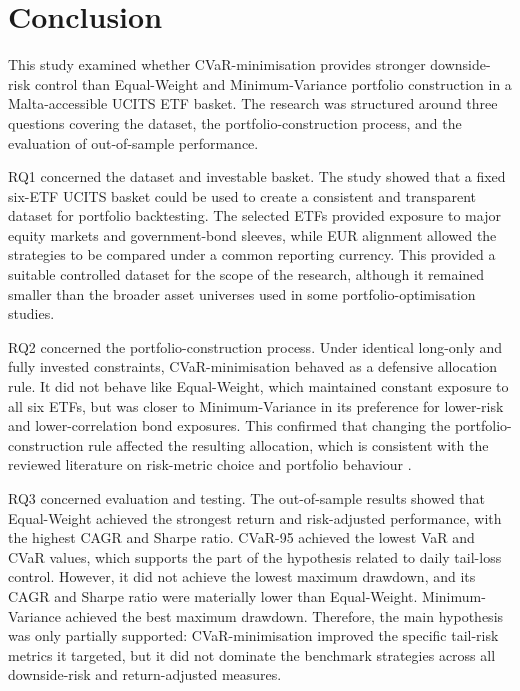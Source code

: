 \section{Conclusion}
\label{sec:Con}

\par This study examined whether CVaR-minimisation provides stronger downside-risk control than Equal-Weight and Minimum-Variance portfolio construction in a Malta-accessible UCITS ETF basket. The research was structured around three questions covering the dataset, the portfolio-construction process, and the evaluation of out-of-sample performance.

\par RQ1 concerned the dataset and investable basket. The study showed that a fixed six-ETF UCITS basket could be used to create a consistent and transparent dataset for portfolio backtesting. The selected ETFs provided exposure to major equity markets and government-bond sleeves, while EUR alignment allowed the strategies to be compared under a common reporting currency. This provided a suitable controlled dataset for the scope of the research, although it remained smaller than the broader asset universes used in some portfolio-optimisation studies.

\par RQ2 concerned the portfolio-construction process. Under identical long-only and fully invested constraints, CVaR-minimisation behaved as a defensive allocation rule. It did not behave like Equal-Weight, which maintained constant exposure to all six ETFs, but was closer to Minimum-Variance in its preference for lower-risk and lower-correlation bond exposures. This confirmed that changing the portfolio-construction rule affected the resulting allocation, which is consistent with the reviewed literature on risk-metric choice and portfolio behaviour \cite{munoz2026riskmetrics,teplova2023blcopula}.

\par RQ3 concerned evaluation and testing. The out-of-sample results showed that Equal-Weight achieved the strongest return and risk-adjusted performance, with the highest CAGR and Sharpe ratio. CVaR-95 achieved the lowest VaR and CVaR values, which supports the part of the hypothesis related to daily tail-loss control. However, it did not achieve the lowest maximum drawdown, and its CAGR and Sharpe ratio were materially lower than Equal-Weight. Minimum-Variance achieved the best maximum drawdown. Therefore, the main hypothesis was only partially supported: CVaR-minimisation improved the specific tail-risk metrics it targeted, but it did not dominate the benchmark strategies across all downside-risk and return-adjusted measures.

